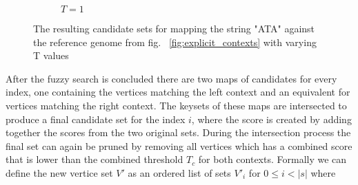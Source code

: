 \documentclass[thesis.tex]{subfiles}
\begin{document}
\begin{wrapfigure}{L}{0.5\textwidth}
\begin{subfigure}[t]{\textwidth}
\begin{mdframed}
    \end{mdframed}
    \caption{$T=1$}
  \end{subfigure}
  \caption{The resulting candidate sets for mapping the string "ATA" against the reference genome from fig. ~\ref{fig:explicit_contexts} with varying T values}
  \label{fig:candidate_nodes}
\end{wrapfigure}
\par\noindent
After the fuzzy search is concluded there are two maps of candidates for every index, one containing the vertices matching the left context and an equivalent for vertices matching the right context. The keysets of these maps are intersected to produce a final candidate set for the index $i$, where the score is created by adding together the scores from the two original sets. During the intersection process the final set can again be pruned by removing all vertices which has a combined score that is lower than the combined threshold $T_c$ for both contexts. Formally we can define the new vertice set $V'$ as an ordered list of sets $V'_i$ for $0 \leq i < |s|$ where
\end{document}
